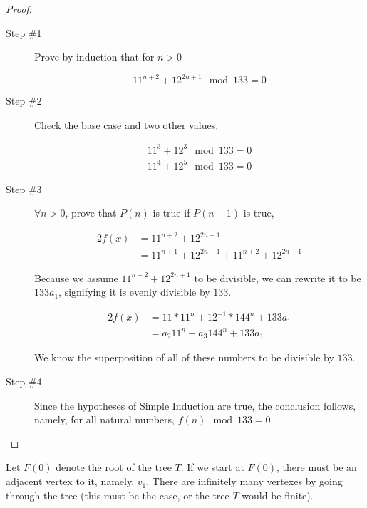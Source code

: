\documentclass[12pt]{scrartcl}
\begin{document}
\begin{proof}
    \begin{description}
        \item[Step \#1] Prove by induction that for $n > 0$

            \begin{equation*}
                11^{n + 2} + 12^{2n + 1} \mod 133 = 0
            \end{equation*}


        \item[Step \#2] Check the base case and two other values,

           \begin{align*}
               11^3 + 12^3 \mod 133 = 0 \\
               11^4 + 12^5 \mod 133 = 0
           \end{align*}

       \item[Step \#3] $\forall n > 0$, prove that $P(n)$ is true if $P(n - 1)$ is true,

           \begin{alignat*}{2}
               f(x) &= 11^{n + 2} + 12^{2n + 1} \\
                    &= 11^{n + 1} + 12^{2n - 1} + 11^{n + 2} + 12^{2n + 1}
           \end{alignat*}

           Because we assume $11^{n + 2} + 12^{2n + 1}$ to be divisible, we can rewrite it to be $133a_1$, signifying it is evenly divisible by $133$.

           \begin{alignat*}{2}
               f(x) &= 11 * 11^n + 12^{-1} * 144^n + 133a_1 \\
                    &= a_2 11^n + a_3 144^n + 133a_1
           \end{alignat*}

            We know the superposition of all of these numbers to be divisible by $133$.

       \item[Step \#4]  Since the hypotheses of Simple Induction are true, the conclusion follows, namely, for all natural numbers, $f(n) \mod 133 = 0$.
    \end{description}
\end{proof}

\problem{}
Let $F(0)$ denote the root of the tree $T$. If we start at $F(0)$, there must be an adjacent vertex to it, namely, $v_1$. There are infinitely many vertexes by going through the tree (this must be the case, or the tree $T$ would be finite).
\end{document}
